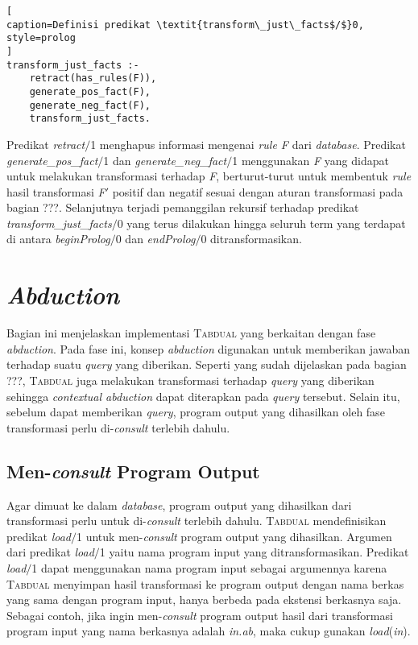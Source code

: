 \begin{lstlisting}[
caption=Definisi predikat \textit{transform\_just\_facts$/$}0,
style=prolog
]
transform_just_facts :-
	retract(has_rules(F)),
	generate_pos_fact(F),
	generate_neg_fact(F),
	transform_just_facts.
\end{lstlisting}

Predikat \textit{retract$/$}1 menghapus informasi mengenai \textit{rule F} dari \textit{database}. Predikat \textit{generate\_pos\_fact$/$}1 dan \textit{generate\_neg\_fact$/$}1 menggunakan \textit{F} yang didapat untuk melakukan transformasi terhadap \textit{F}, berturut-turut untuk membentuk \textit{rule} hasil transformasi \textit{F$'$} positif dan negatif sesuai dengan aturan transformasi pada bagian ???. Selanjutnya terjadi pemanggilan rekursif terhadap predikat \textit{transform\_just\_facts$/$}0 yang terus dilakukan hingga seluruh term yang terdapat di antara \textit{beginProlog$/$}0 dan \textit{endProlog$/$}0 ditransformasikan.

\section{\textit{Abduction}}

Bagian ini menjelaskan implementasi \textsc{Tabdual} yang berkaitan dengan fase \textit{abduction}. Pada fase ini, konsep \textit{abduction} digunakan untuk memberikan jawaban terhadap suatu \textit{query} yang diberikan. Seperti yang sudah dijelaskan pada bagian ???, \textsc{Tabdual} juga melakukan transformasi terhadap \textit{query} yang diberikan sehingga \textit{contextual abduction} dapat diterapkan pada \textit{query} tersebut. Selain itu, sebelum dapat memberikan \textit{query}, program output yang dihasilkan oleh fase transformasi perlu di-\textit{consult} terlebih dahulu.

\subsection{Men-\textit{consult} Program Output}

Agar dimuat ke dalam \textit{database}, program output yang dihasilkan dari transformasi perlu untuk di-\textit{consult} terlebih dahulu. \textsc{Tabdual} mendefinisikan predikat \textit{load$/$}1 untuk men-\textit{consult} program output yang dihasilkan. Argumen dari predikat \textit{load$/$}1 yaitu nama program input yang ditransformasikan. Predikat \textit{load$/$}1 dapat menggunakan nama program input sebagai argumennya karena \textsc{Tabdual} menyimpan hasil transformasi ke program output dengan nama berkas yang sama dengan program input, hanya berbeda pada ekstensi berkasnya saja. Sebagai contoh, jika ingin men-\textit{consult} program output hasil dari transformasi program input yang nama berkasnya adalah \textit{in.ab}, maka cukup gunakan \textit{load}(\textit{in}).

